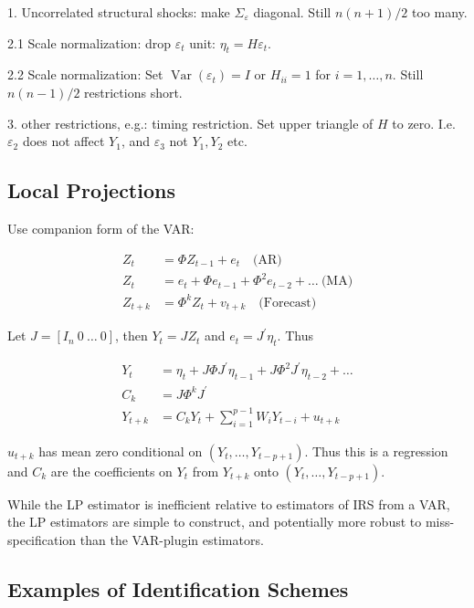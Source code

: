 1. Uncorrelated structural shocks: make $\Sigma_\varepsilon$ diagonal. Still $n(n+1)/2$ too many.

2.1 Scale normalization: drop $\varepsilon_t$ unit: $\eta_t = H\varepsilon_t$.

2.2 Scale normalization: Set $\operatorname{Var}(\varepsilon_t)=I$ or $H_{ii}=1$ for $i=1, \ldots, n$.
Still $n(n-1)/2$ restrictions short.

3. other restrictions, e.g.: timing restriction. Set upper triangle of $H$ to zero. I.e. $\varepsilon_2$ does not affect $Y_1$, and $\varepsilon_3$ not $Y_1, Y_2$ etc.

\subsection{Local Projections}

Use companion form of the VAR:

\begin{align*}
    Z_t&=\Phi Z_{t-1}+e_t \quad \text{(AR)} \\
    Z_t&=e_t+\Phi e_{t-1}+\Phi^2 e_{t-2}+\ldots \: \text{(MA)} \\
    Z_{t+k}&=\Phi^k Z_t+v_{t+k} \quad \text{(Forecast)}
\end{align*}

Let $J = [I_n \: 0 \: \ldots \: 0]$, then $Y_t = J Z_t$ and $e_t = J^\prime \eta_t$. Thus

\begin{align*}
    Y_t&=\eta_t+J \Phi J^{\prime} \eta_{t-1}+J \Phi^2 J^{\prime} \eta_{t-2}+\ldots \\
    C_k&=J \Phi^k J^{\prime} \\
    Y_{t+k}&=C_k Y_t+\sum_{i=1}^{p-1} W_i Y_{t-i}+u_{t+k}
\end{align*}

$u_{t+k}$ has mean zero conditional on $(Y_t,\ldots,Y_{t-p+1})$. Thus this is a regression and $C_k$ are the coefficients on $Y_t$ from $Y_{t+k}$ onto $(Y_t,\ldots,Y_{t-p+1})$.

While the LP estimator is inefficient relative to estimators of IRS from a VAR, the LP estimators
are simple to construct, and potentially more robust to miss-specification than the VAR-plugin
estimators.

\subsection{Examples of Identification Schemes}

